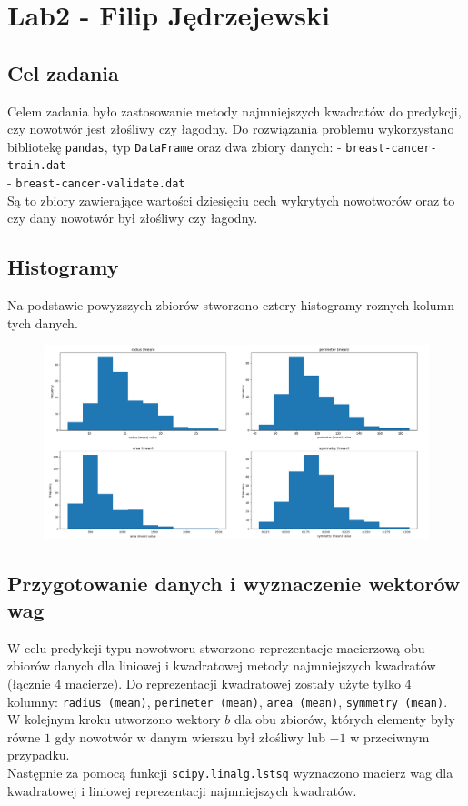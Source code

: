 \documentclass{article}
\begin{document}
	\section*{Lab2 - Filip Jędrzejewski}
	
	\subsection*{Cel zadania}
	
	Celem zadania było zastosowanie metody najmniejszych kwadratów do predykcji, czy 	nowotwór jest złośliwy czy łagodny. Do rozwiązania problemu wykorzystano bibliotekę 		\texttt{pandas}, typ \texttt{DataFrame} oraz dwa zbiory danych: \newline
	- \texttt{breast-cancer-train.dat}\\
	- \texttt{breast-cancer-validate.dat}\\
	Są to zbiory zawierające wartości dziesięciu cech wykrytych nowotworów oraz to czy dany nowotwór był złośliwy czy łagodny.
	
	\subsection*{Histogramy}
	
	Na podstawie powyzszych zbiorów stworzono cztery histogramy roznych kolumn tych danych.
	
	\begin{figure}[h]
    		\centering
  		\includegraphics[scale = 0.25]{histograms.png}
	\end{figure}
	
	\subsection*{Przygotowanie danych i wyznaczenie wektorów wag}
	
	W celu predykcji typu nowotworu stworzono reprezentacje macierzową obu zbiorów danych dla liniowej i kwadratowej metody najmniejszych kwadratów (łącznie 4 macierze). Do reprezentacji kwadratowej zostały użyte tylko 4 kolumny: \texttt{radius (mean)}, \texttt{perimeter (mean)}, \texttt{area (mean)}, \texttt{symmetry (mean)}.\\
	W kolejnym kroku utworzono wektory $b$ dla obu zbiorów, których elementy były równe $1$ gdy nowotwór w danym wierszu był złośliwy lub $-1$ w przeciwnym przypadku.\\
	Następnie za pomocą funkcji \texttt{scipy.linalg.lstsq} wyznaczono macierz wag dla kwadratowej i liniowej reprezentacji najmniejszych kwadratów. \\
	
\end{document}
